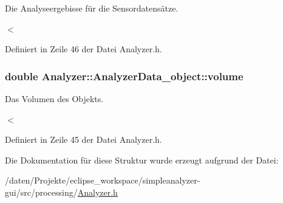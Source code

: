Die Analyseergebisse für die Sensordatensätze. 

$<$ 

Definiert in Zeile 46 der Datei Analyzer.\-h.

\hypertarget{structAnalyzer_1_1AnalyzerData__object_a78ddeb311ff702e110fc1d483d826920}{
\subsubsection[{volume}]{\setlength{\rightskip}{0pt plus 5cm}double Analyzer\-::\-Analyzer\-Data\-\_\-object\-::volume}}\label{structAnalyzer_1_1AnalyzerData__object_a78ddeb311ff702e110fc1d483d826920}


Das Volumen des Objekts. 

$<$ 

Definiert in Zeile 45 der Datei Analyzer.\-h.



Die Dokumentation für diese Struktur wurde erzeugt aufgrund der Datei\-:\begin{DoxyCompactItemize}
\item 
/daten/\-Projekte/eclipse\-\_\-workspace/simpleanalyzer-\/gui/src/processing/\hyperlink{Analyzer_8h}{Analyzer.\-h}\end{DoxyCompactItemize}

